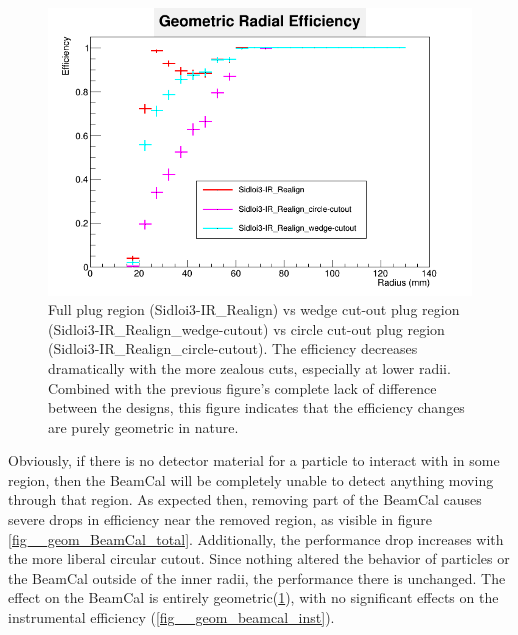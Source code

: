 \documentclass{report}
\begin{document}
                \begin{figure}[H]
                    \includegraphics[height=.4\textheight]{RadialEfficiency_geometric_geom}
                    \centering
                    \caption{Full plug region (Sidloi3-IR\_Realign) vs wedge cut-out plug region
                            (Sidloi3-IR\_Realign\_wedge-cutout) vs circle cut-out plug region
                            (Sidloi3-IR\_Realign\_circle-cutout). The efficiency decreases dramatically 
                            with the more zealous cuts, especially at lower radii. Combined with the 
                            previous figure's complete lack of difference between the designs, this figure
                            indicates that the efficiency changes are purely geometric in nature.}
                    \label{fig__geom_beamcal_geom}
                \end{figure}

                Obviously, if there is no detector material for a particle to interact with in some region, then the BeamCal will be completely unable to detect anything moving through that region. As expected then, removing part of the BeamCal causes severe drops in efficiency near the removed region, as visible in figure \ref{fig__geom_BeamCal_total}. Additionally, the performance drop increases with the more liberal circular cutout. Since nothing altered the behavior of particles or the BeamCal outside of the inner radii, the performance there is unchanged. The effect on the BeamCal is entirely geometric(\ref{fig__geom_beamcal_geom}), with no significant effects on the instrumental efficiency (\ref{fig__geom_beamcal_inst}).
                
\end{document}
